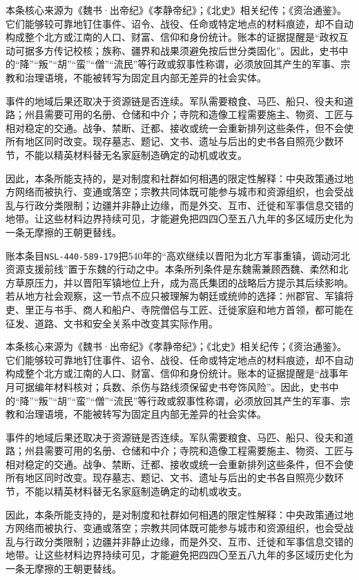 本条核心来源为《魏书·出帝纪》《孝静帝纪》；《北史》相关纪传；《资治通鉴》。它们能够较可靠地钉住事件、诏令、战役、任命或特定地点的材料痕迹，却不自动构成整个北方或江南的人口、财富、信仰和身份统计。账本的证据提醒是“政权互动可据多方传记校核；族称、疆界和战果须避免按后世分类固化”。因此，史书中的“降”“叛”“胡”“蛮”“僧”“流民”等行政或叙事性称谓，必须放回其产生的军事、宗教和治理语境，不能被转写为固定且内部无差异的社会实体。

事件的地域后果还取决于资源链是否连续。军队需要粮食、马匹、船只、役夫和道路；州县需要可用的名册、仓储和中介；寺院和造像工程需要施主、物资、工匠与相对稳定的交通。战争、禁断、迁都、接收或统一会重新排列这些条件，但不会使所有地区同时改变。现存墓志、题记、文书、遗址与后出的史书各自照亮少数环节，不能以精英材料替无名家庭制造确定的动机或收支。

因此，本条所能支持的，是对制度和社群如何相遇的限定性解释：中央政策通过地方网络而被执行、变通或落空；宗教共同体既可能参与城市和资源组织，也会受战乱与行政分类限制；边疆并非静止边缘，而是外交、互市、迁徙和军事信息交错的地带。让这些材料边界持续可见，才能避免把四四〇至五八九年的多区域历史化为一条无摩擦的王朝更替线。

账本条目\texttt{NSL-440-589-179}把540年的“高欢继续以晋阳为北方军事重镇，调动河北资源支援前线”置于东魏的行动之中。本条所列条件是东魏需兼顾西魏、柔然和北方草原压力，并以晋阳军镇地位上升，成为高氏集团的战略后方提示其后续影响。若从地方社会观察，这一节点不应只被理解为朝廷或统帅的选择：州郡官、军镇将吏、里正与书手、商人和船户、寺院僧侣与工匠、迁徙家庭和地方首领，都可能在征发、道路、文书和安全关系中改变其实际作用。

本条核心来源为《魏书·出帝纪》《孝静帝纪》；《北史》相关纪传；《资治通鉴》。它们能够较可靠地钉住事件、诏令、战役、任命或特定地点的材料痕迹，却不自动构成整个北方或江南的人口、财富、信仰和身份统计。账本的证据提醒是“战事年月可据编年材料核对；兵数、杀伤与路线须保留史书夸饰风险”。因此，史书中的“降”“叛”“胡”“蛮”“僧”“流民”等行政或叙事性称谓，必须放回其产生的军事、宗教和治理语境，不能被转写为固定且内部无差异的社会实体。

事件的地域后果还取决于资源链是否连续。军队需要粮食、马匹、船只、役夫和道路；州县需要可用的名册、仓储和中介；寺院和造像工程需要施主、物资、工匠与相对稳定的交通。战争、禁断、迁都、接收或统一会重新排列这些条件，但不会使所有地区同时改变。现存墓志、题记、文书、遗址与后出的史书各自照亮少数环节，不能以精英材料替无名家庭制造确定的动机或收支。

因此，本条所能支持的，是对制度和社群如何相遇的限定性解释：中央政策通过地方网络而被执行、变通或落空；宗教共同体既可能参与城市和资源组织，也会受战乱与行政分类限制；边疆并非静止边缘，而是外交、互市、迁徙和军事信息交错的地带。让这些材料边界持续可见，才能避免把四四〇至五八九年的多区域历史化为一条无摩擦的王朝更替线。

